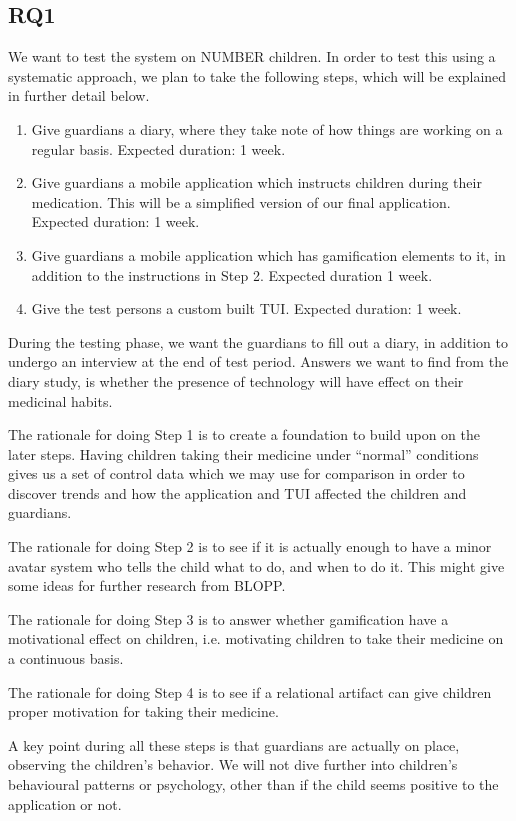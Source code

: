\subsection{RQ1}
\label{sec:RQ2-methodology}
We want to test the system on NUMBER children. In order to test this using a systematic approach, we plan to take the following steps, which will be explained in further detail below. 
\begin{enumerate}
  \item Give guardians a diary, where they take note of how things are working on a regular basis. Expected duration: 1 week.
  \item Give guardians a mobile application which instructs children during their medication. This will be a simplified version of our final application. Expected duration: 1 week. 
  \item Give guardians a mobile application which has gamification elements to it, in addition to the instructions in Step 2. Expected duration 1 week.   
  \item Give the test persons a custom built TUI. Expected duration: 1 week. 
\end{enumerate}
During the testing phase, we want the guardians to fill out a diary, in addition to undergo an interview at the end of test period. Answers we want to find from the diary study, is whether the presence of technology will have effect on their medicinal habits. 

The rationale for doing Step 1 is to create a foundation to build upon on the later steps. Having children taking their medicine under ``normal'' conditions gives us a set of control data which we may use for comparison in order to discover trends and how the application and TUI affected the children and guardians. 

The rationale for doing Step 2 is to see if it is actually enough to have a minor avatar system who tells the child what to do, and when to do it. This might give some ideas for further research from BLOPP. 


The rationale for doing Step 3 is to answer whether gamification have a motivational effect on children, i.e. motivating children to take their medicine on a continuous basis. 

The rationale for doing Step 4 is to see if a relational artifact can give children proper motivation for taking their medicine.

A key point during all these steps is that guardians are actually on place, observing the children's behavior. We will not dive further into children's behavioural patterns or psychology, other than if the child seems positive to the application or not.    
 
